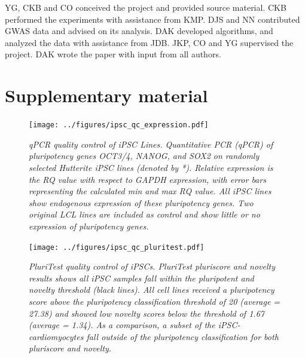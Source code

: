 \documentclass{article}
\begin{document}
YG, CKB and CO conceived the project and provided source material.
CKB performed the experiments with assistance from KMP.
DJS and NN contributed GWAS data and advised on its analysis. 
DAK developed algorithms, and analyzed the data with assistance from JDB.
JKP, CO and YG supervised the project.
DAK wrote the paper with input from all authors.

     
\clearpage

\setcounter{figure}{0}
\makeatletter 
\renewcommand{\thefigure}{S\@arabic\c@figure}

\section*{Supplementary material} 


\begin{figure}[h]
\begin{center}
    \texttt{[image: ../figures/ipsc\_qc\_expression.pdf]} 
    \caption{\it{qPCR quality control of iPSC Lines. Quantitative PCR (qPCR) of pluripotency genes OCT3/4, NANOG, and SOX2 on randomly selected Hutterite iPSC lines (denoted by *). Relative expression is the RQ value with respect to GAPDH expression, with error bars representing the calculated min and max RQ value. All iPSC lines show endogenous expression of these pluripotency genes. Two original LCL lines are included as control and show little or no expression of pluripotency genes.}}
    \label{fig:ipsc_qc_expression}
    \end{center}
\end{figure}

\begin{figure}[h]
\begin{center}
    \texttt{[image: ../figures/ipsc\_qc\_pluritest.pdf]} 
    \caption{\it{PluriTest quality control of iPSCs. PluriTest pluriscore and novelty results shows all iPSC samples fall within the pluripotent and novelty threshold (black lines). All cell lines received a pluripotency score above the pluripotency classification threshold of 20 (average = 27.38) and showed low novelty scores below the threshold of 1.67 (average = 1.34). As a comparison, a subset of the iPSC-cardiomyocytes fall outside of the pluripotency classification for both pluriscore and novelty.}}
    \label{fig:ipsc_qc_pluritest}
    \end{center}
\end{figure}
\end{document}
